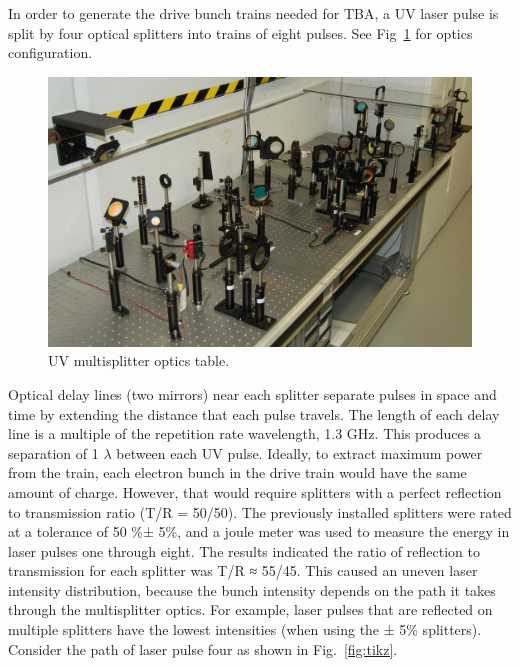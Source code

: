 \documentclass{iitthesis}
\begin{document}
In order to generate the drive bunch trains needed for TBA, a UV laser pulse is split 
by four optical splitters into trains of eight pulses. See Fig~\ref{fig:multisplit} 
for optics configuration.
\begin{figure}[h]
	\begin{center}
		\includegraphics[width=1.0\textwidth]{images/multisplitter}\caption{UV multisplitter optics table.}
	\end{center}
	\label{fig:multisplit}
\end{figure}
Optical delay lines (two mirrors) near each splitter 
separate pulses in space and time by extending the distance that each pulse travels. 
The length of each delay line is a multiple of the repetition rate wavelength, 1.3 GHz. 
This produces a separation of 1 $\lambda$ between each UV pulse. 
Ideally, to extract maximum power from the train, 
each electron bunch in the drive train would have the same amount of charge. 
However, that would require splitters with a perfect reflection to transmission ratio (T/R = 50/50).
The previously installed splitters were rated at a tolerance of 50 \%± 5\%, 
and a joule meter was used to measure the energy in laser pulses one through eight. 
The results indicated the ratio of reflection to transmission for each splitter was T/R ≈ 55/45. 
This caused an uneven laser intensity distribution, because the bunch intensity depends on the path 
it takes through the multisplitter optics. For example, laser pulses that are reflected on multiple 
splitters have the lowest intensities (when using the ± 5\% splitters). 
Consider the path of laser pulse four as shown in Fig.~\ref{fig:tikz}. 
\def \delayvertical {1.5}
\def \delayoneleft {5.0}
\def \delaytworight{10.0}
\end{document}
